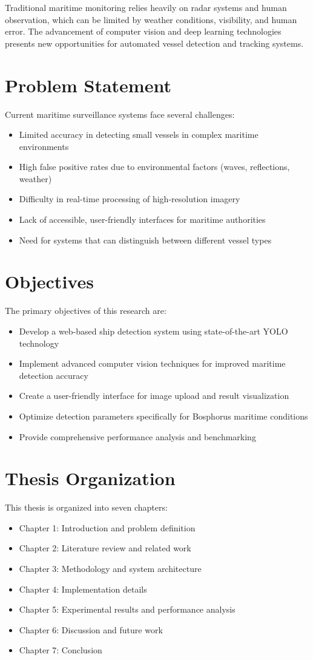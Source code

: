 \documentclass[12pt,a4paper]{report}
\begin{document}
Traditional maritime monitoring relies heavily on radar systems and human observation, which can be limited by weather conditions, visibility, and human error. The advancement of computer vision and deep learning technologies presents new opportunities for automated vessel detection and tracking systems.

\section{Problem Statement}
Current maritime surveillance systems face several challenges:
\begin{itemize}
    \item Limited accuracy in detecting small vessels in complex maritime environments
    \item High false positive rates due to environmental factors (waves, reflections, weather)
    \item Difficulty in real-time processing of high-resolution imagery
    \item Lack of accessible, user-friendly interfaces for maritime authorities
    \item Need for systems that can distinguish between different vessel types
\end{itemize}

\section{Objectives}
The primary objectives of this research are:
\begin{itemize}
    \item Develop a web-based ship detection system using state-of-the-art YOLO technology
    \item Implement advanced computer vision techniques for improved maritime detection accuracy
    \item Create a user-friendly interface for image upload and result visualization
    \item Optimize detection parameters specifically for Bosphorus maritime conditions
    \item Provide comprehensive performance analysis and benchmarking
\end{itemize}

\section{Thesis Organization}
This thesis is organized into seven chapters:
\begin{itemize}
    \item Chapter 1: Introduction and problem definition
    \item Chapter 2: Literature review and related work
    \item Chapter 3: Methodology and system architecture
    \item Chapter 4: Implementation details
    \item Chapter 5: Experimental results and performance analysis
    \item Chapter 6: Discussion and future work
    \item Chapter 7: Conclusion
\end{itemize}
\end{document}
